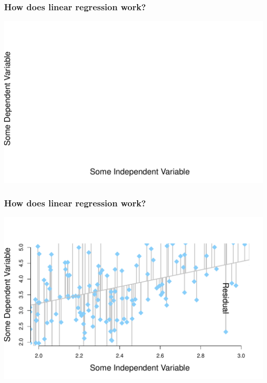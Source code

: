 \documentclass[aspectratio=169]{beamer}
\theoremstyle{principle}
\begin{document}
\begin{frame}
\frametitle{How does linear regression work?}
\begin{center}
\includegraphics[scale=0.6]{point_cloud_line_zoomed_residual.pdf}
\end{center}

\end{frame}

\begin{frame}
\frametitle{How does linear regression work?}
\begin{center}
\includegraphics[scale=0.6]{point_cloud_line_zoomed_residuals.pdf}
\end{center}

\end{frame}
\end{document}
